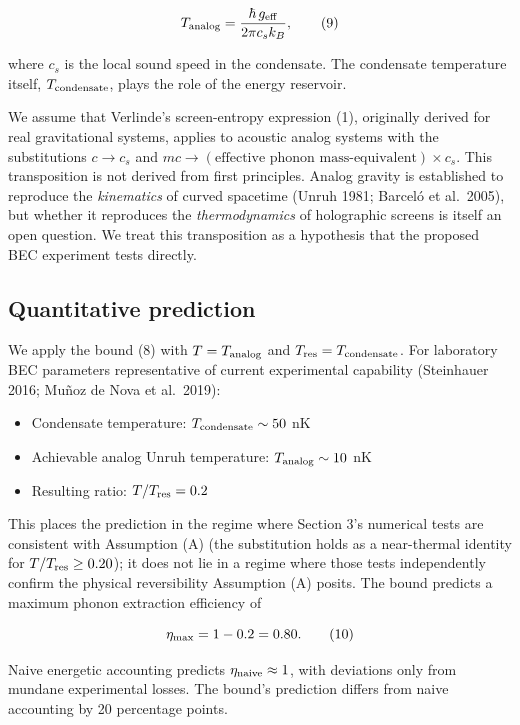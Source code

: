 \documentclass[11pt]{article}
\providecommand{\tightlist}{\setlength{\itemsep}{2pt}\setlength{\parskip}{0pt}}
\begin{document}
\[T_{\rm analog} = \frac{\hbar\,g_{\rm eff}}{2\pi c_s k_B}, \tag{9}\]

where \(c_s\) is the local sound speed in the condensate. The condensate temperature itself, \(T_{\rm condensate}\), plays the role of the energy reservoir.

We assume that Verlinde's screen-entropy expression (1), originally derived for real gravitational systems, applies to acoustic analog systems with the substitutions \(c \to c_s\) and \(m c \to (\text{effective phonon mass-equivalent}) \times c_s\). This transposition is not derived from first principles. Analog gravity is established to reproduce the \emph{kinematics} of curved spacetime (Unruh 1981; Barceló et al.~2005), but whether it reproduces the \emph{thermodynamics} of holographic screens is itself an open question. We treat this transposition as a hypothesis that the proposed BEC experiment tests directly.

\subsection{Quantitative prediction}\label{quantitative-prediction}

We apply the bound (8) with \(T = T_{\rm analog}\) and \(T_{\rm res} = T_{\rm condensate}\). For laboratory BEC parameters representative of current experimental capability (Steinhauer 2016; Muñoz de Nova et al.~2019):

\begin{itemize}
\tightlist
\item
  Condensate temperature: \(T_{\rm condensate} \sim 50\) nK
\item
  Achievable analog Unruh temperature: \(T_{\rm analog} \sim 10\) nK
\item
  Resulting ratio: \(T/T_{\rm res} = 0.2\)
\end{itemize}

This places the prediction in the regime where Section 3's numerical tests are consistent with Assumption (A) (the substitution holds as a near-thermal identity for $T/T_{\rm res}\geq 0.20$); it does not lie in a regime where those tests independently confirm the physical reversibility Assumption (A) posits. The bound predicts a maximum phonon extraction efficiency of

\[\eta_{\rm max} = 1 - 0.2 = 0.80. \tag{10}\]

Naive energetic accounting predicts \(\eta_{\rm naive} \approx 1\), with deviations only from mundane experimental losses. The bound's prediction differs from naive accounting by 20 percentage points.
\end{document}
